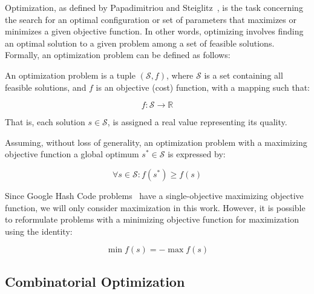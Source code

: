 Optimization, as defined by Papadimitriou and
Steiglitz~\cite{papadimitriou1998combinatorial}, is the task concerning the
search for an optimal configuration or set of parameters that maximizes or
minimizes a given objective function. In other words, optimizing involves
finding an optimal solution to a given problem among a set of feasible
solutions. Formally, an optimization problem can be defined as follows:

\begin{definition}
  \label{def:optimization-problem}
  An optimization problem is a tuple $(\mathcal{S}, f)$, where
  $\mathcal{S}$ is a set containing all feasible solutions, and $f$ is an
  objective (cost) function, with a mapping such that:

  \begin{equation}
    \label{eq:optimization-problem}
    f \colon \mathcal{S} \longrightarrow \mathbb{R}
  \end{equation}

  That is, each solution $s \in \mathcal{S}$, is assigned a real value
  representing its quality.
\end{definition}

\begin{definition}
  \label{def:global-optimum}
  Assuming, without loss of generality, an optimization problem with a maximizing
  objective function a global optimum $s^* \in \mathcal{S}$ is expressed by:

  \begin{equation}
    \forall s \in \mathcal{S} \colon f(s^{*}) \geq f(s)
  \end{equation}

\end{definition}

Since Google Hash Code problems~\cite{googlellc2023codingcompetitionsarchive}
have a single-objective maximizing objective function, we will only consider
maximization in this work. However, it is possible to reformulate problems with
a minimizing objective function for maximization~\cite{nocedal2006numerical}
using the identity:

\begin{equation}
  \label{eq:max2min}
  \min{f(s)} = - \max{f(s)}
\end{equation}

\subsection{Combinatorial Optimization}
\label{subsec:combinatorial-optimization}

